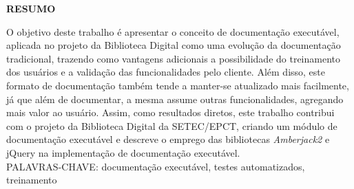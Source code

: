 \begin{center}
\textbf{RESUMO}
\end{center}
\singlespacing

\noindent O objetivo deste trabalho é apresentar o conceito de documentação executável, aplicada no projeto da Biblioteca Digital como uma evolução da documentação tradicional, trazendo como vantagens adicionais a possibilidade do treinamento dos usuários e a validação das funcionalidades pelo cliente. Além disso, este formato de documentação também tende a manter-se atualizado mais facilmente, já que além de documentar, a mesma assume outras funcionalidades, agregando mais valor ao usuário. Assim, como resultados diretos, este trabalho contribui com o projeto da Biblioteca Digital da SETEC/EPCT, criando um módulo de documentação executável e descreve o emprego das bibliotecas \textit{Amberjack2} e jQuery na implementação de documentação executável. \\

\noindent PALAVRAS-CHAVE: documentação executável, testes automatizados, treinamento
